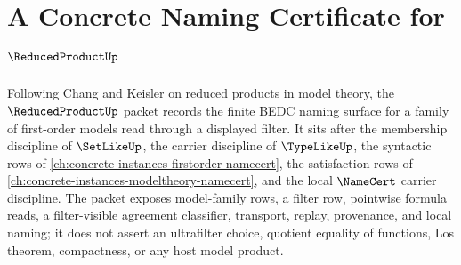 \chapter{A Concrete Naming Certificate for $\ReducedProductUp$}
\label{ch:concrete-instances-reduced-product-namecert}

Following Chang and Keisler on reduced products in model theory, the $\ReducedProductUp$ packet records the finite BEDC naming surface for a family of first-order models read through a displayed filter. It sits after the membership discipline of $\SetLikeUp$, the carrier discipline of $\TypeLikeUp$, the syntactic rows of \autoref{ch:concrete-instances-firstorder-namecert}, the satisfaction rows of \autoref{ch:concrete-instances-modeltheory-namecert}, and the local $\NameCert$ carrier discipline. The packet exposes model-family rows, a filter row, pointwise formula reads, a filter-visible agreement classifier, transport, replay, provenance, and local naming; it does not assert an ultrafilter choice, quotient equality of functions, Los theorem, compactness, or any host model product.

